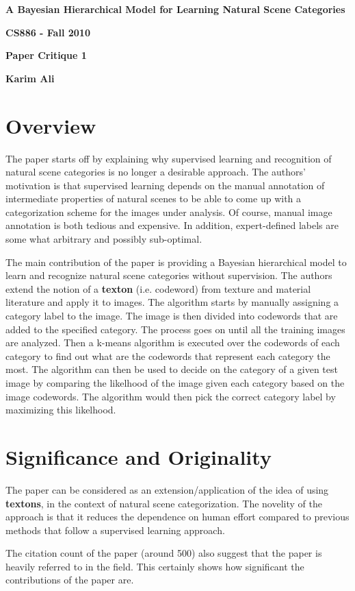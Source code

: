 \documentclass[11pt,a4paper]{article}
\begin{document}
\centerline{\sc \large \textbf{A Bayesian Hierarchical Model for Learning Natural Scene Categories}}
\centerline{\textbf{CS886 - Fall 2010}}
\centerline{\textbf{Paper Critique 1}}
\centerline{\textbf{Karim Ali}}
\vspace{2pc}

\section{Overview}
The paper starts off by explaining why supervised learning and recognition of natural scene categories is no longer a desirable approach. The authors'
motivation is that supervised learning depends on the manual annotation of intermediate properties of natural scenes to be able to come up with a categorization
scheme for the images under analysis. Of course, manual image annotation is both tedious and expensive. In addition, expert-defined labels are some what
arbitrary and possibly sub-optimal.

The main contribution of the paper is providing a Bayesian hierarchical model to learn and recognize natural scene categories without supervision. The authors
extend the notion of a \textbf{texton} (i.e. codeword) from texture and material literature and apply it to images. The algorithm starts by manually assigning a
category label to the image. The image is then divided into codewords that are added to the specified category. The process goes on until all the training
images are analyzed. Then a k-means algorithm is executed over the codewords of each category to find out what are the codewords that represent each
category the most. The algorithm can then be used to decide on the category of a given test image by comparing the likelhood of the image given each category
based on the image codewords. The algorithm would then pick the correct category label by maximizing this likelhood.

\section{Significance and Originality}
The paper can be considered as an extension/application of the idea of using \textbf{textons}, in the context of natural scene categorization. The novelity of
the approach is that it reduces the dependence on human effort compared to previous methods that follow a supervised learning approach.

The citation count of the paper (around 500) also suggest that the paper is heavily referred to in the field. This certainly shows how significant the
contributions of the paper are.
\end{document}
